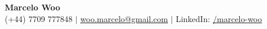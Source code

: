 \documentclass[letterpaper,11pt]{article}
\newcommand{\link}[2]{{\color{NavyBlue}\href{#1}{#2}}}
\begin{document}

    \textbf{\Huge Marcelo Woo} \\ \vspace{1pt}
    \small 
    (+44) 7709 777848
    $|$ \link{mailto:woo.marcelo@gmail.com}{\underline{woo.marcelo@gmail.com}} 
    $|$ LinkedIn: \link{https://linkedin.com/in/marcelo-woo}{\underline{/marcelo-woo}} 
    
    


\end{document}

